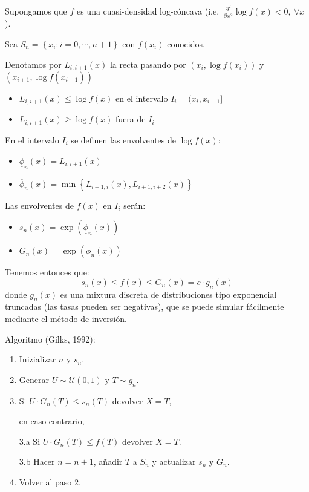 \documentclass[
]{book}
\theoremstyle{break}
\theoremstyle{definition}
\theoremstyle{definition}
\theoremstyle{definition}
\theoremstyle{definition}
\theoremstyle{remark}
\begin{document}
Supongamos que \(f\) es una cuasi-densidad log-cóncava
(i.e.~\(\frac{\partial ^{2}}{\partial x^{2}}\log f(x) <0, ~\forall x\)).

Sea \(S_n=\left\{ x_{i}:i=0,\cdots ,n+1\right\}\) con
\(f(x_{i})\) conocidos.

Denotamos por \(L_{i,i+1}(x)\) la recta pasando por \(\left( x_{i},\log f(x_{i})\right)\) y \(\left( x_{i+1},\log f(x_{i+1})\right)\)

\begin{itemize}
\item
  \(L_{i,i+1}(x)\leq \log f(x)\) en el intervalo
  \(I_{i}=(x_{i},x_{i+1}]\)
\item
  \(L_{i,i+1}(x)\geq \log f(x)\) fuera de \(I_{i}\)
\end{itemize}

En el intervalo \(I_{i}\) se definen las envolventes de \(\log f\left( x\right)\):

\begin{itemize}
\item
  \(\underline{\phi}_n(x)=L_{i,i+1}(x)\)
\item
  \(\overline{\phi}_n(x)=\min \left\{L_{i-1,i}(x),L_{i+1,i+2}(x)\right\}\)
\end{itemize}

Las envolventes de \(f(x)\) en \(I_{i}\) serán:

\begin{itemize}
\item
  \(s_n(x)=\exp \left( \underline{\phi}_n(x)\right)\)
\item
  \(G_n(x)=\exp \left( \overline{\phi}_n(x)\right)\)
\end{itemize}

Tenemos entonces que:
\[s_n(x)\leq f(x) \leq G_n(x)=c\cdot g_n(x)\]
donde \(g_n(x)\) es una mixtura discreta de distribuciones tipo exponencial truncadas
(las tasas pueden ser negativas),
que se puede simular fácilmente mediante el método de inversión.

Algoritmo (Gilks, 1992):

\begin{enumerate}
\def\labelenumi{\arabic{enumi}.}
\item
  Inizializar \(n\) y \(s_n\).
\item
  Generar \(U \sim \mathcal{U}(0, 1)\) y
  \(T\sim g_n\).
\item
  Si \(U\cdot G_n\left( T\right) \leq s_n\left( T\right)\)
  devolver \(X=T\),

  en caso contrario,

  3.a Si \(U\cdot G_n\left( T\right) \leq f\left( T\right)\)
  devolver \(X=T\).

  3.b Hacer \(n=n+1\), añadir \(T\) a \(S_n\)
  y actualizar \(s_n\) y \(G_n\).
\item
  Volver al paso 2.
\end{enumerate}
\end{document}
